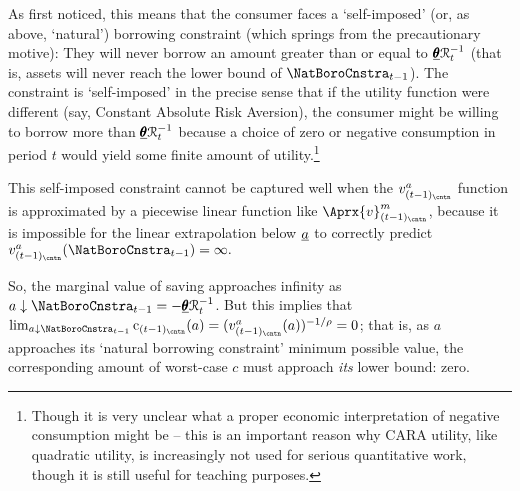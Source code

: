 \documentclass[titlepage, headings=optiontotocandhead]{Resources/texmf-local/tex/latex/econtex}
\begin{document}
As \cite{zeldesStochastic} first noticed, this means that the consumer faces a `self-imposed' (or, as above, `natural') borrowing constraint (which springs from the precautionary motive): They will never borrow an amount greater than or equal to $\underline{\pmb{\theta}}\mathcal{R}_{t}^{-1}$ (that is, assets will never reach the lower bound of $\NatBoroCnstra_{t-1}$).  The constraint is `self-imposed' in the precise sense that if the utility function were different (say, Constant Absolute Risk Aversion), the consumer might be willing to borrow more than $\underline{\pmb{\theta}}\mathcal{R}_{t}^{-1}$ because a choice of zero or negative consumption in period $t$ would yield some finite amount of utility.\footnote{Though it is very unclear what a proper economic interpretation of negative consumption might be -- this is an important reason why CARA utility, like quadratic utility, is increasingly not used for serious quantitative work, though it is still useful for teaching purposes.}

This self-imposed constraint cannot be captured well when the $v^{a}_{(t-1)_\cntn}$ function is approximated by a piecewise linear function like $\Aprx{v}^{m}_{(t-1)_\cntn}$, because it is impossible for the linear extrapolation below ${\underline{a}}$ to correctly predict $v^{a}_{(t-1)_\cntn}(\NatBoroCnstra_{t-1})=\infty.$ %


So, the marginal value of saving approaches infinity as $a \downarrow \NatBoroCnstra_{t-1}=-\underline{\TranShkEmp}\RNrm_{t}^{-1}$.  But this implies that $\lim_{a \downarrow \NatBoroCnstra_{t-1}} \cFunc_{(t-1)_\cntn}(a) = (v^{a}_{(t-1)_\cntn}(a))^{-1/\rho} = 0$; that is, as $a$ approaches its `natural borrowing constraint' minimum possible value, the corresponding amount of worst-case $c$ must approach \textit{its} lower bound: zero.
\end{document}
